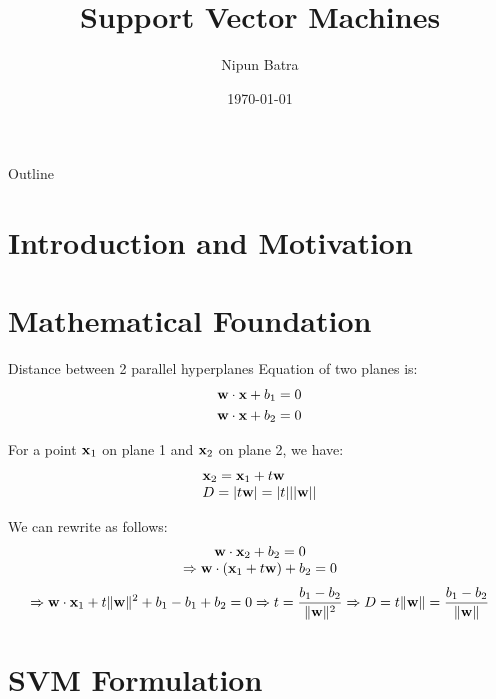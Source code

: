 \documentclass{beamer}
\title{Support Vector Machines}
\date{\today}
\author{Nipun Batra}
\institute{IIT Gandhinagar}
\begin{document}
\maketitle

\begin{frame}{Outline}
\tableofcontents
\end{frame}


\section{Introduction and Motivation}

{
	
}

\section{Mathematical Foundation}

\begin{frame}{Distance between 2 parallel hyperplanes}
Equation of two planes is:
$$
\begin{aligned}
&\mathbf{w}\cdot \mathbf{x}+b_1=0\\
&\mathbf{w}\cdot \mathbf{x}+b_2=0
\end{aligned}
$$

\pause For a point $\mathbf{x}_1$ on plane 1 and $\mathbf{x}_2$ on plane 2, we have:
\pause $$
\begin{array}{l}
{\mathbf{x}_{2}=\mathbf{x}_{1}+t \mathbf{w}} \\
{D=|t \mathbf{w}|=|t|||\mathbf{w}| |}
\end{array}
$$

\pause We can rewrite as follows:
\pause $$
\begin{array}{c}
{\mathbf{w}\cdot \mathbf{x}_{2}+b_{2}=0} \\
{\Rightarrow \mathbf{w} \cdot\left(\mathbf{x}_{1}+t \mathbf{w}\right)+b_{2}=0}
\end{array}
$$
\pause $$
\Rightarrow \mathbf{w} \cdot \mathbf{x}_{1}+t\|\mathbf{w}\|^{2}+b_1-b_1+b_2 = 0
\Rightarrow t = \frac{b_1 - b_2}{\|\mathbf{w}\|^{2}}  \Rightarrow D = t\|\mathbf{w}\| =  \frac{b_1 - b_2}{\|\mathbf{w}\|}
$$
\end{frame}

\section{SVM Formulation}

{
	
}
\end{document}
